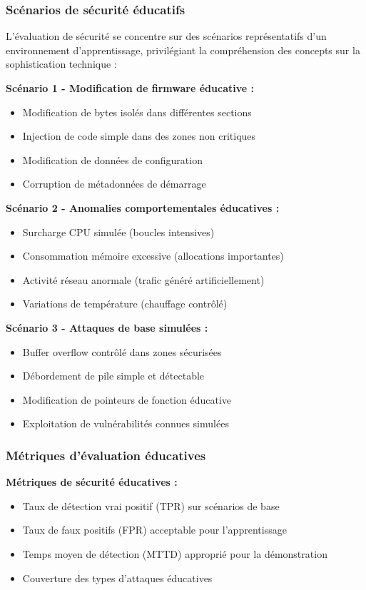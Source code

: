 \subsubsection{Scénarios de sécurité éducatifs}

L'évaluation de sécurité se concentre sur des scénarios représentatifs d'un environnement d'apprentissage, privilégiant la compréhension des concepts sur la sophistication technique :

\textbf{Scénario 1 - Modification de firmware éducative :}
\begin{itemize}
    \item Modification de bytes isolés dans différentes sections
    \item Injection de code simple dans des zones non critiques
    \item Modification de données de configuration
    \item Corruption de métadonnées de démarrage
\end{itemize}

\textbf{Scénario 2 - Anomalies comportementales éducatives :}
\begin{itemize}
    \item Surcharge CPU simulée (boucles intensives)
    \item Consommation mémoire excessive (allocations importantes)
    \item Activité réseau anormale (trafic généré artificiellement)
    \item Variations de température (chauffage contrôlé)
\end{itemize}

\textbf{Scénario 3 - Attaques de base simulées :}
\begin{itemize}
    \item Buffer overflow contrôlé dans zones sécurisées
    \item Débordement de pile simple et détectable
    \item Modification de pointeurs de fonction éducative
    \item Exploitation de vulnérabilités connues simulées
\end{itemize}

\subsubsection{Métriques d'évaluation éducatives}

\textbf{Métriques de sécurité éducatives :}
\begin{itemize}
    \item Taux de détection vrai positif (TPR) sur scénarios de base
    \item Taux de faux positifs (FPR) acceptable pour l'apprentissage
    \item Temps moyen de détection (MTTD) approprié pour la démonstration
    \item Couverture des types d'attaques éducatives
\end{itemize}

